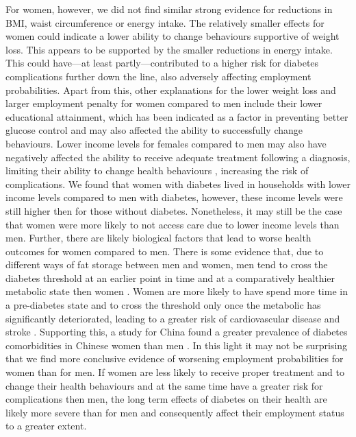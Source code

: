 For women, however, we did not find similar strong evidence for reductions in \ac{BMI}, waist circumference or energy intake. The relatively smaller effects for women could indicate a lower ability to change behaviours supportive of weight loss. This appears to be supported by the smaller reductions in energy intake. This could have---at least partly---contributed to a higher risk for diabetes complications further down the line, also adversely affecting employment probabilities. Apart from this, other explanations for the lower weight loss and larger employment penalty for women compared to men include their lower educational attainment, which has been indicated as a factor in preventing better glucose control \autocite{Luo2015} and may also affected the ability to successfully change behaviours. Lower income levels for females compared to men may also have negatively affected the ability to receive adequate treatment following a diagnosis, limiting their ability to change health behaviours \autocite{Luo2015}, increasing the risk of complications. We found that women with diabetes lived in households with lower income levels compared to men with diabetes, however, these income levels were still higher then for those without diabetes. Nonetheless, it may still be the case that women were more likely to not access care due to lower income levels than men. Further, there are likely biological factors that lead to worse health outcomes for women compared to men. There is some evidence that, due to different ways of fat storage between men and women, men tend to cross the diabetes threshold at an earlier point in time and at a comparatively healthier metabolic state then women \parencite{Peters2015,Peters2014a,Peters2014}. Women are more likely to have spend more time in a pre-diabetes state \parencite{Bertram2010} and to cross the threshold only once the metabolic has significantly deteriorated, leading to a greater risk of cardiovascular disease and stroke \parencite{Peters2015}. Supporting this, a study for China found a greater prevalence of diabetes comorbidities in Chinese women than men \autocite{Liu2010}. In this light it may not be surprising that we find more conclusive evidence of worsening employment probabilities for women than for men. If women are less likely to receive proper treatment and to change their health behaviours and at the same time have a greater risk for complications then men, the long term effects of diabetes on their health are likely more severe than for men and consequently affect their employment status to a greater extent.


